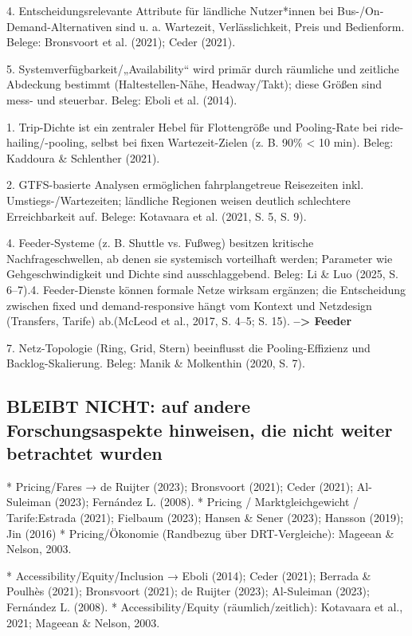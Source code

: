 4. Entscheidungsrelevante Attribute für ländliche Nutzer*innen bei Bus-/On-Demand-Alternativen sind u. a. Wartezeit, Verlässlichkeit, Preis und Bedienform. Belege: Bronsvoort et al. (2021); Ceder (2021).

5. Systemverfügbarkeit/„Availability“ wird primär durch räumliche und zeitliche Abdeckung bestimmt (Haltestellen-Nähe, Headway/Takt); diese Größen sind mess- und steuerbar. Beleg: Eboli et al. (2014).

1. Trip-Dichte ist ein zentraler Hebel für Flottengröße und Pooling-Rate bei ride-hailing/-pooling, selbst bei fixen Wartezeit-Zielen (z. B. 90\% < 10 min). Beleg: Kaddoura \& Schlenther (2021).

2. GTFS-basierte Analysen ermöglichen fahrplangetreue Reisezeiten inkl. Umstiegs-/Wartezeiten; ländliche Regionen weisen deutlich schlechtere Erreichbarkeit auf. Belege: Kotavaara et al. (2021, S. 5, S. 9).

4. Feeder-Systeme (z. B. Shuttle vs. Fußweg) besitzen kritische Nachfrageschwellen, ab denen sie systemisch vorteilhaft werden; Parameter wie Gehgeschwindigkeit und Dichte sind ausschlaggebend. Beleg: Li \& Luo (2025, S. 6–7).4. Feeder-Dienste können formale Netze wirksam ergänzen; die Entscheidung zwischen fixed und demand-responsive hängt vom Kontext und Netzdesign (Transfers, Tarife) ab.(McLeod et al., 2017, S. 4–5; S. 15).
\textbf{--> Feeder}

7. Netz-Topologie (Ring, Grid, Stern) beeinflusst die Pooling-Effizienz und Backlog-Skalierung. Beleg: Manik \& Molkenthin (2020, S. 7).




\subsection{ BLEIBT NICHT: auf andere Forschungsaspekte hinweisen, die nicht weiter betrachtet wurden}
* Pricing/Fares → de Ruijter (2023); Bronsvoort (2021); Ceder (2021); Al-Suleiman (2023); Fernández L. (2008).
* Pricing / Marktgleichgewicht / Tarife:Estrada (2021); Fielbaum (2023); Hansen \& Sener (2023); Hansson (2019); Jin (2016)
* Pricing/Ökonomie (Randbezug über DRT-Vergleiche): Mageean \& Nelson, 2003.



* Accessibility/Equity/Inclusion → Eboli (2014); Ceder (2021); Berrada \& Poulhès (2021); Bronsvoort (2021); de Ruijter (2023); Al-Suleiman (2023); Fernández L. (2008).
* Accessibility/Equity (räumlich/zeitlich): Kotavaara et al., 2021; Mageean \& Nelson, 2003.





